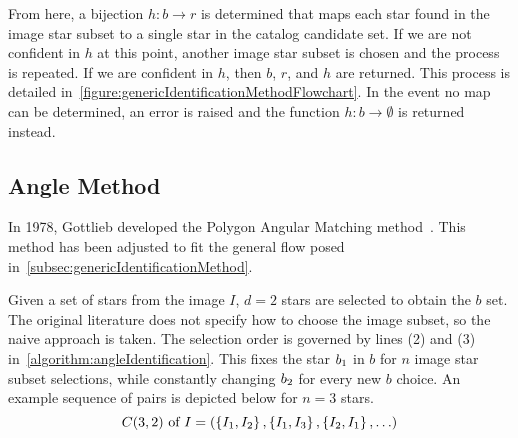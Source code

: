 From here, a bijection $h: b \rightarrow r$ is determined that maps each star found in the image star subset to a
single star in the catalog candidate set.
If we are not confident in $h$ at this point, another image star subset is chosen and the process is repeated.
If we are confident in $h$, then $b$, $r$, and $h$ are returned.
This process is detailed in~\autoref{figure:genericIdentificationMethodFlowchart}.
In the event no map can be determined, an error is raised and the function $h: b \rightarrow \emptyset$ is returned
instead.


\subsection{Angle Method}\label{subsec:angleMethod}
In 1978, Gottlieb developed the Polygon Angular Matching method~\cite{Angle,AnalysisUncompensated}.
This method has been adjusted to fit the general flow posed in~\autoref{subsec:genericIdentificationMethod}.

Given a set of stars from the image $I$, $d = 2$ stars are selected to obtain the $b$ set.
The original literature does not specify how to choose the image subset, so the naive approach is taken.
The selection order is governed by lines (2) and (3) in~\autoref{algorithm:angleIdentification}.
This fixes the star $b_1$ in $b$ for $n$ image star subset selections, while constantly changing
$b_2$ for every new $b$ choice.
An example sequence of pairs is depicted below for $n = 3$ stars.
\begin{equation}
    C(3, 2) \text{ of } I = \left(\left\{ I_1, I_2 \right\}, \left\{ I_1,I_3 \right\}, \left\{ I_2,I_1 \right\},
    \ldots \right)
\end{equation}

